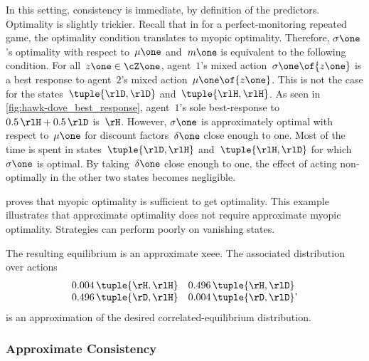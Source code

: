 In this setting, consistency is immediate, by definition of the predictors.
Optimality is slightly trickier.
Recall that in  for a perfect-monitoring repeated game, the optimality condition translates to myopic optimality.
Therefore, \(\sigma\one\)'s optimality with respect to~\(\mu\one\) and~\(m\one\) is equivalent to the following condition.
For all~\(z\one \in \cZ\one\), agent~\(1\)'s mixed action~\(\sigma\one \of{z\one}\) is a best response to agent~\(2\)'s mixed action~\(\mu\one \of{z\one}\).
This is not the case for the states~\(\tuple{\rlD, \rlD}\) and~\(\tuple{\rlH, \rlH}\).
As seen in \cref{fig:hawk-dove_best_response}, agent~\(1\)'s sole best-response to~\(0.5 \, \rlH + 0.5 \, \rlD\) is~\(\rH\).
However, \(\sigma\one\) is approximately optimal with respect to~\(\mu\one\) for discount factors~\(\delta\one\) close enough to one.
Most of the time is spent in states~\(\tuple{\rlD, \rlH}\) and~\(\tuple{\rlH, \rlD}\) for which~\(\sigma\one\) is optimal.
By taking~\(\delta\one\) close enough to one, the effect of acting non-optimally in the other two states becomes negligible.

 proves that myopic optimality is sufficient to get optimality.
This example illustrates that approximate optimality does not require approximate myopic optimality.
Strategies can perform poorly on vanishing states.

The resulting equilibrium is an approximate \ac{xeee}.
The associated distribution over actions
\[
\begin{matrix}
0.004 \, \tuple{\rH, \rlH} & 0.496 \, \tuple{\rH, \rlD} \\
0.496 \, \tuple{\rD, \rlH} & 0.004 \, \tuple{\rD, \rlD}
\end{matrix},
\]
is an approximation of the desired correlated-equilibrium distribution.

\subsubsection{Approximate Consistency}

